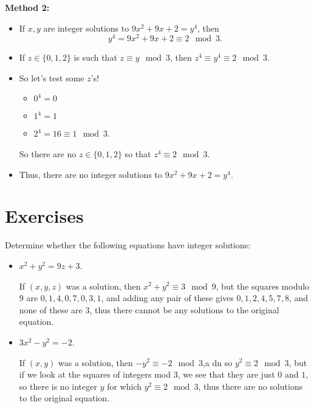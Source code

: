 \documentclass[11pt,dvipsnames]{book}
\numberwithin{equation}{section} %
\numberwithin{figure}{section} %
\numberwithin{table}{section} %
\begin{document}
\begin{exercise}
{\bf Method 2:} 
\begin{itemize}
\item If $x,y$ are integer solutions to $9x^{2}+9x+2=y^{4}$, then 
\[
y^{4}=9x^{2}+9x+2  
\equiv 2\mod 3.
\] 
\item If $z\in \{0,1,2\}$ is such that $z\equiv y\mod 3$, then   $z^{4}\equiv y^{4}\equiv 2\mod 3$.  
\item So let's test some $z$'s! 
\begin{itemize}
\item $0^{4}=0$ 
\item $1^{4}=1$ 
\item $2^{4}=16\equiv 1 \mod 3$.  
\end{itemize}
So there are no $z\in \{0,1,2\}$ so that $z^{4}\equiv 2 \mod 3$.  
\item Thus, there are no integer solutions to $9x^{2}+9x+2=y^{4}$.
\end{itemize}





 

\section{Exercises}




\begin{exercise} Determine whether the following equations have integer solutions:
\begin{itemize}
\item $x^2+y^2=9z+3$.

\begin{solution}
If $(x,y,z)$ was a solution, then $x^2+y^2\equiv 3\mod 9$, but the squares modulo $9$ are $0,1,4,0,7,0,3,1$, and adding any pair of these gives $0,1,2,4,5,7,8$, and none of these are $3$, thus there cannot be any solutions to the original equation.
\end{solution}


\item $3x^2-y^2=-2$.

\begin{solution}
If $(x,y)$ was a solution, then $-y^2\equiv -2\mod 3$,a dn so $y^2\equiv 2\mod 3$, but if we look at the squares of integers mod 3, we see that they are just $0$ and $1$, so there is no integer $y$ for which $y^2\equiv 2 \mod 3$, thus there are no solutions to the original equation.
\end{solution}




\end{itemize}
\end{exercise}
\end{exercise}
\end{document}
